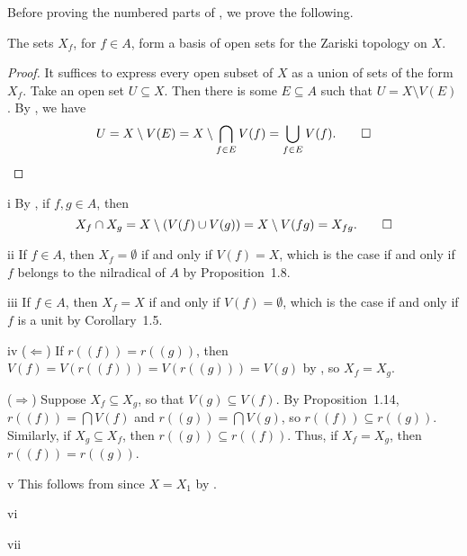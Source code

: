 Before proving the numbered parts of , we prove the following.

\begin{claim}
The sets \(X_f\), for \(f \in A\), form a basis of open sets for the Zariski topology on \(X\).
\end{claim}

\begin{proof}
It suffices to express every open subset of \(X\) as a union of sets of the form \(X_f\).
Take an open set \(U \subseteq X\).
Then there is some \(E \subseteq A\) such that \(U = X \setminus V(E)\).
By , we have
\begin{equation*}
U
= X \setminus V(E)
= X \setminus \bigcap_{f \in E} V(f)
= \bigcup_{f \in E} V(f).
\qedhere
\end{equation*}
\end{proof}

\begin{partsolution}{i}
By , if \(f, g \in A\), then
\begin{equation*}
X_f \cap X_g = X \setminus (V(f) \cup V(g)) = X \setminus V(f g) = X_{f g}.
\qedhere
\end{equation*}
\end{partsolution}

\begin{partsolution}{ii}
If \(f \in A\), then \(X_f = \emptyset\) if and only if \(V(f) = X\), which is the case if and only if \(f\) belongs to the nilradical of \(A\) by Proposition~1.8.
\end{partsolution}

\begin{partsolution}{iii}
If \(f \in A\), then \(X_f = X\) if and only if \(V(f) = \emptyset\), which is the case if and only if \(f\) is a unit by Corollary~1.5.
\end{partsolution}

\begin{partsolution}{iv}
(\(\Leftarrow\))
If \(r((f)) = r((g))\), then \(V(f) = V(r((f))) = V(r((g))) = V(g)\) by , so \(X_f = X_g\).

(\(\Rightarrow\))
Suppose \(X_f \subseteq X_g\), so that \(V(g) \subseteq V(f)\).
By Proposition~1.14, \(r((f)) = \bigcap V(f)\) and \(r((g)) = \bigcap V(g)\), so \(r((f)) \subseteq r((g))\).
Similarly, if \(X_g \subseteq X_f\), then \(r((g)) \subseteq r((f))\).
Thus, if \(X_f = X_g\), then \(r((f)) = r((g))\).
\end{partsolution}

\begin{partsolution}{v}
This follows from  since \(X = X_1\) by .
\end{partsolution}

\begin{partsolution}{vi}

\end{partsolution}

\begin{partsolution}{vii}

\end{partsolution}